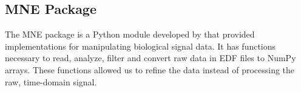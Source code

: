 \subsection*{MNE Package}

The MNE package is a Python module developed by \citet{mne} that provided implementations for manipulating biological signal data. It has functions necessary to read, analyze, filter and convert raw data in EDF files to NumPy arrays. These functions allowed us to refine the data instead of processing the raw, time-domain signal.